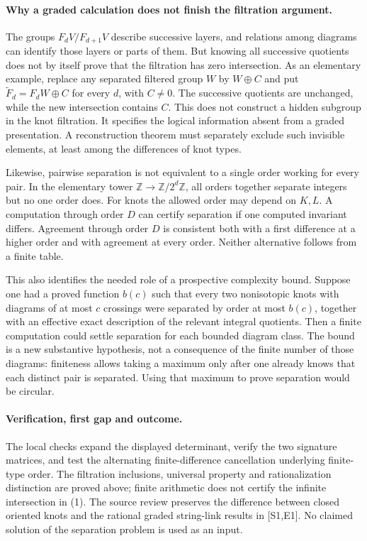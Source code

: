 \documentclass[11pt]{article}
\begin{document}
\paragraph{Why a graded calculation does not finish the filtration argument.}
The groups $F_dV/F_{d+1}V$ describe successive layers, and relations
among diagrams can identify those layers or parts of them. But knowing
all successive quotients does not by itself prove that the filtration
has zero intersection. As an elementary example, replace any separated
filtered group $W$ by $W\oplus C$ and put
$\widetilde F_d=F_dW\oplus C$ for every $d$, with $C\ne0$. The
successive quotients are unchanged, while the new intersection contains
$C$. This does not construct a hidden subgroup in the knot filtration.
It specifies the logical information absent from a graded
presentation. A reconstruction theorem must separately exclude such
invisible elements, at least among the differences of knot types.

Likewise, pairwise separation is not equivalent to a single order
working for every pair. In the elementary tower
$\mathbb Z\to\mathbb Z/2^d\mathbb Z$, all orders together separate
integers but no one order does. For knots the allowed order may depend
on $K,L$. A computation through order $D$ can certify separation if one
computed invariant differs. Agreement through order $D$ is consistent
both with a first difference at a higher order and with agreement at
every order. Neither alternative follows from a finite table.

This also identifies the needed role of a prospective complexity
bound. Suppose one had a proved function $b(c)$ such that every two
nonisotopic knots with diagrams of at most $c$ crossings were separated
by order at most $b(c)$, together with an effective exact description
of the relevant integral quotients. Then a finite computation could
settle separation for each bounded diagram class. The bound is a new
substantive hypothesis, not a consequence of the finite number of
those diagrams: finiteness allows taking a maximum only after one
already knows that each distinct pair is separated. Using that maximum
to prove separation would be circular.

\paragraph{Verification, first gap and outcome.}
The local checks expand the displayed determinant, verify the two
signature matrices, and test the alternating finite-difference
cancellation underlying finite-type order. The filtration inclusions,
universal property and rationalization distinction are proved above;
finite arithmetic does not certify the infinite intersection in (1).
The source review preserves the difference between closed oriented
knots and the rational graded string-link results in [S1,E1]. No
claimed solution of the separation problem is used as an input.
\end{document}

